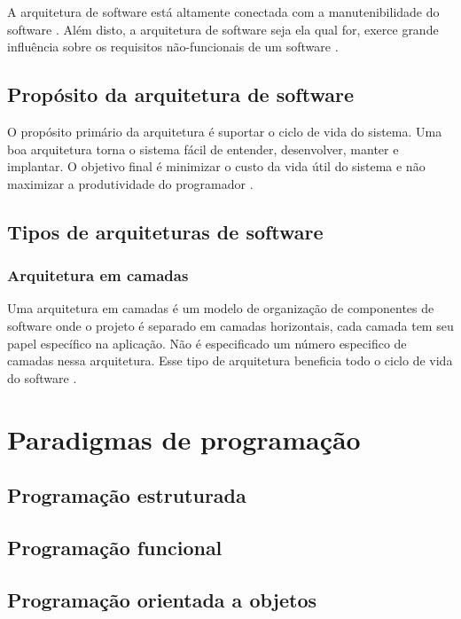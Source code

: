         \par A arquitetura de software está altamente conectada com a manutenibilidade do software \cite{artigo:dantas:2021}. Além disto, a arquitetura de software seja ela qual for, exerce grande influência sobre os requisitos não-funcionais de um software \cite{artigo:lopes:2021}.
    
    \subsection{Propósito da arquitetura de software}
        \par O propósito primário da arquitetura é suportar o ciclo de vida do sistema. Uma boa arquitetura torna o sistema fácil de entender, desenvolver, manter e implantar. O objetivo final é minimizar o custo da vida útil do sistema e não maximizar a produtividade do programador \cite{livro:martin:cleanarch}.


    \subsection{Tipos de arquiteturas de software}
        \subsubsection{Arquitetura em camadas}
            \par Uma arquitetura em camadas é um modelo de organização de componentes de software onde o projeto é separado em camadas horizontais, cada camada tem seu papel específico na aplicação. Não é especificado um número especifico de camadas nessa arquitetura. Esse tipo de arquitetura beneficia todo o ciclo de vida do software \cite{artigo:bueno:2021}.

\section{Paradigmas de programação}
    \subsection{Programação estruturada}
    \subsection{Programação funcional}
    \subsection{Programação orientada a objetos}

